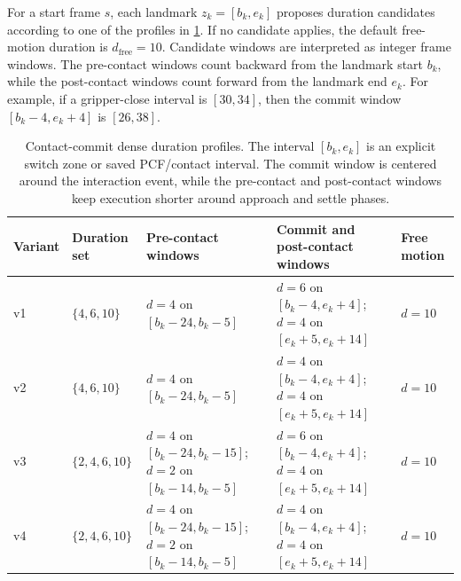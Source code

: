 \documentclass[10pt,twocolumn,letterpaper]{article}
\begin{document}
For a start frame $s$, each landmark $z_k=[b_k,e_k]$ proposes duration candidates according to one of the profiles in \cref{tab:contact-commit-duration-profiles}. If no candidate applies, the default free-motion duration is $d_{\mathrm{free}}=10$. Candidate windows are interpreted as integer frame windows. The pre-contact windows count backward from the landmark start $b_k$, while the post-contact windows count forward from the landmark end $e_k$. For example, if a gripper-close interval is $[30,34]$, then the commit window $[b_k-4,e_k+4]$ is $[26,38]$.

\begin{table}[t]
\centering
\scriptsize
\begin{tabular}{@{}p{}p{}p{}p{}p{}@{}}
\toprule
Variant & Duration set & Pre-contact windows & Commit and post-contact windows & Free motion \\
\midrule
v1 & $\{4,6,10\}$ & $d=4$ on $[b_k-24,b_k-5]$ & $d=6$ on $[b_k-4,e_k+4]$; $d=4$ on $[e_k+5,e_k+14]$ & $d=10$ \\
v2 & $\{4,6,10\}$ & $d=4$ on $[b_k-24,b_k-5]$ & $d=4$ on $[b_k-4,e_k+4]$; $d=4$ on $[e_k+5,e_k+14]$ & $d=10$ \\
v3 & $\{2,4,6,10\}$ & $d=4$ on $[b_k-24,b_k-15]$; $d=2$ on $[b_k-14,b_k-5]$ & $d=6$ on $[b_k-4,e_k+4]$; $d=4$ on $[e_k+5,e_k+14]$ & $d=10$ \\
v4 & $\{2,4,6,10\}$ & $d=4$ on $[b_k-24,b_k-15]$; $d=2$ on $[b_k-14,b_k-5]$ & $d=4$ on $[b_k-4,e_k+4]$; $d=4$ on $[e_k+5,e_k+14]$ & $d=10$ \\
\bottomrule
\end{tabular}
\caption{Contact-commit dense duration profiles. The interval $[b_k,e_k]$ is an explicit switch zone or saved PCF/contact interval. The commit window is centered around the interaction event, while the pre-contact and post-contact windows keep execution shorter around approach and settle phases.}
\label{tab:contact-commit-duration-profiles}
\end{table}
\end{document}
